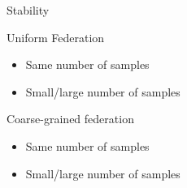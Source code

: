 \documentclass[presentation]{beamer}
\begin{document}
\begin{frame}[label={sec:org56ea401}]{Stability}
\begin{block}{Uniform Federation}
\begin{itemize}
\item Same number of samples
\item Small/large number of samples
\end{itemize}
\end{block}

\begin{block}{Coarse-grained federation}
\begin{itemize}
\item Same number of samples
\item Small/large number of samples
\end{itemize}
\end{block}
\end{frame}
\end{document}
